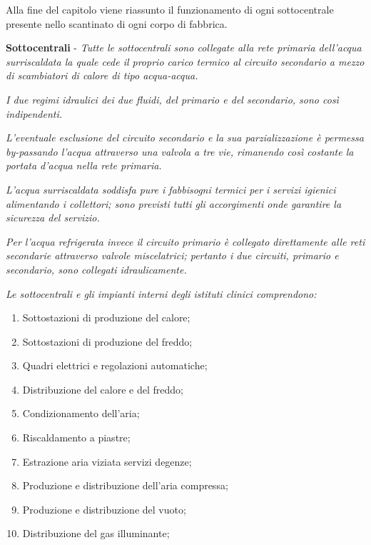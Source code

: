 Alla fine del capitolo viene riassunto il funzionamento di ogni sottocentrale presente nello scantinato di ogni corpo di fabbrica.
\begin{quoting}
	\textbf{Sottocentrali} - \emph{Tutte le sottocentrali sono collegate alla rete primaria dell'acqua surriscaldata la quale cede il proprio carico termico  al circuito secondario a mezzo di scambiatori di calore di tipo acqua-acqua.}
	
	\emph{I due regimi idraulici dei due fluidi, del primario e del secondario, sono così indipendenti.}
	
	\emph{L'eventuale esclusione del circuito secondario e la sua parzializzazione è permessa by-passando l'acqua attraverso una valvola a tre vie, rimanendo così costante la portata d'acqua nella rete primaria.}
	
	\emph{L'acqua surriscaldata soddisfa pure i fabbisogni termici per i servizi igienici alimentando i collettori; sono previsti tutti gli accorgimenti onde garantire la sicurezza del servizio.}
	
	\emph{Per l'acqua refrigerata invece il circuito primario è collegato direttamente alle reti secondarie attraverso valvole miscelatrici; pertanto i due circuiti, primario e secondario, sono collegati idraulicamente.}

\sdots


\noindent\emph{Le sottocentrali e gli impianti interni degli istituti clinici comprendono:}	
\begin{enumerate}
	\item Sottostazioni di produzione del calore;
	\item Sottostazioni di produzione del freddo;
	\item Quadri elettrici e regolazioni automatiche;
	\item Distribuzione del calore e del freddo;
	\item Condizionamento dell'aria;
	\item Riscaldamento a piastre;
	\item Estrazione aria viziata servizi degenze;
	\item Produzione e distribuzione dell'aria compressa;
	\item Produzione e distribuzione del vuoto;
	\item Distribuzione del gas illuminante;
\end{enumerate}

\end{quoting}
